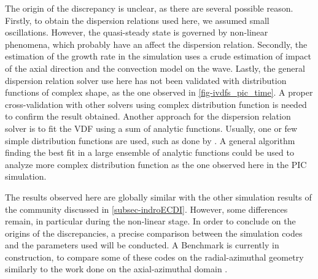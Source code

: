  The origin of the discrepancy is unclear, as there are several possible reason.
  Firstly, to obtain the dispersion relations used here, we assumed small oscillations.
  However, the quasi-steady state is governed by non-linear phenomena, which probably have an affect the dispersion relation.
  Secondly, the estimation of the growth rate in the simulation uses a crude estimation of impact of the axial direction and the convection model on the wave.
  Lastly, the general dispersion relation solver use here has not been validated with distribution functions of complex shape, as the one observed in \cref{fig-ivdfs_pic_time}.
  A proper cross-validation with other solvers using complex distribution function is needed to confirm the result obtained.  
  Another approach for the dispersion relation solver is to fit the VDF using a sum of analytic functions.
  Usually, one or few simple distribution functions are used, such as done by \citet{ronnmark1982}.
  A general algorithm finding the best fit in a large ensemble of analytic functions could be used to analyze more complex distribution function as the one observed here in the PIC simulation.

  \vspace{1ex}
  The results observed here are globally similar with the other simulation results of the community discussed in \cref{subsec-indroECDI}.
  However, some differences remain, in particular during the non-linear stage.
  In order to conclude on the origins of the discrepancies, a precise comparison between the simulation codes and the parameters used will be conducted.
  A Benchmark is currently in construction, to compare some of these codes on the radial-azimuthal geometry similarly to the work done on the axial-azimuthal domain \citep{charoy2019}.
  
  
